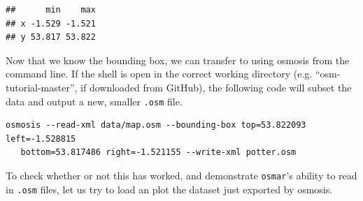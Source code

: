 \documentclass[]{article}
\newenvironment{Shaded}{}{}
\newcommand{\KeywordTok}[1]{\textcolor[rgb]{0.00,0.44,0.13}{\textbf{{#1}}}}
\newcommand{\DecValTok}[1]{\textcolor[rgb]{0.25,0.63,0.44}{{#1}}}
\newcommand{\FloatTok}[1]{\textcolor[rgb]{0.25,0.63,0.44}{{#1}}}
\newcommand{\StringTok}[1]{\textcolor[rgb]{0.25,0.44,0.63}{{#1}}}
\newcommand{\CommentTok}[1]{\textcolor[rgb]{0.38,0.63,0.69}{\textit{{#1}}}}
\newcommand{\NormalTok}[1]{{#1}}
\begin{document}
\begin{Shaded}
\end{Shaded}
\begin{verbatim}
##      min    max
## x -1.529 -1.521
## y 53.817 53.822
\end{verbatim}
Now that we know the bounding box, we can transfer to using osmosis from
the command line. If the shell is open in the correct working directory
(e.g. ``osm-tutorial-master'', if downloaded from GitHub), the following
code will subset the data and output a new, smaller \texttt{.osm} file.

\begin{verbatim}
osmosis --read-xml data/map.osm --bounding-box top=53.822093 left=-1.528815
   bottom=53.817486 right=-1.521155 --write-xml potter.osm
\end{verbatim}
To check whether or not this has worked, and demonstrate
\texttt{osmar}'s ability to read in \texttt{.osm} files, let us try to
load an plot the dataset just exported by osmosis.
\end{document}
